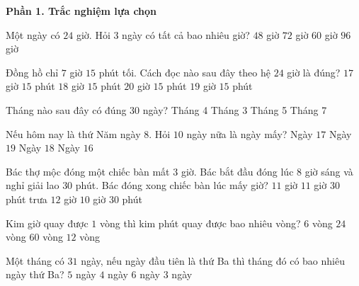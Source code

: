 \textbf{Phần 1. Trắc nghiệm lựa chọn}

\begin{ex} %
Một ngày có $24$ giờ. Hỏi $3$ ngày có tất cả bao nhiêu giờ?
\choice
{$48$ giờ}
{\True $72$ giờ}
{$60$ giờ}
{$96$ giờ}
\end{ex}

\begin{ex} %
Đồng hồ chỉ $7$ giờ $15$ phút tối. Cách đọc nào sau đây theo hệ $24$ giờ là đúng?
\choice
{$17$ giờ $15$ phút}
{$18$ giờ $15$ phút}
{$20$ giờ $15$ phút}
{\True $19$ giờ $15$ phút}
\end{ex}

\begin{ex} %
Tháng nào sau đây có đúng $30$ ngày?
\choice
{\True Tháng 4}
{Tháng 3}
{Tháng 5}
{Tháng 7}
\end{ex}

\begin{ex} %
Nếu hôm nay là thứ Năm ngày $8$. Hỏi $10$ ngày nữa là ngày mấy?
\choice
{Ngày $17$}
{Ngày $19$}
{\True Ngày $18$}
{Ngày $16$}
\end{ex}

\begin{ex} %
Bác thợ mộc đóng một chiếc bàn mất $3$ giờ. Bác bắt đầu đóng lúc $8$ giờ sáng và nghỉ giải lao $30$ phút. Bác đóng xong chiếc bàn lúc mấy giờ?
\choice
{$11$ giờ}
{\True $11$ giờ $30$ phút trưa}
{$12$ giờ}
{$10$ giờ $30$ phút}
\end{ex}

\begin{ex} %
Kim giờ quay được $1$ vòng thì kim phút quay được bao nhiêu vòng?
\choice
{$6$ vòng}
{$24$ vòng}
{$60$ vòng}
{\True $12$ vòng}
\end{ex}

\begin{ex} %
Một tháng có $31$ ngày, nếu ngày đầu tiên là thứ Ba thì tháng đó có bao nhiêu ngày thứ Ba?
\choice
{\True $5$ ngày}
{$4$ ngày}
{$6$ ngày}
{$3$ ngày}
\end{ex}

